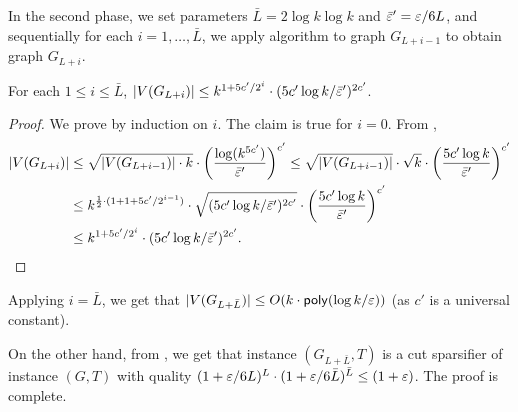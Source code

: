 In the second phase, we set parameters $\bar L=2\log k\log k$ and $\bar{{\varepsilon}}'={\varepsilon}/6L$, and sequentially for each $i=1,\ldots,\bar L$, we apply algorithm  to graph $G_{L+i-1}$ to obtain graph $G_{L+i}$.

\begin{claim}
	For each $1\le i\le \bar L$, $|V(G_{L+i})|\le k^{1+5c'/2^i}\cdot (5c'\log k/\bar{{\varepsilon}}')^{2c'}$.
\end{claim}
\begin{proof}
	We prove by induction on $i$. The claim is true for $i=0$.
	From ,
	\[
	\begin{split}
	|V(G_{L+i})| & \le \sqrt{|V(G_{L+i-1})|\cdot k}\cdot \bigg(\frac{\log (k^{5c'})}{\bar{{\varepsilon}}'}\bigg)^{c'}
	\le 
	\sqrt{|V(G_{L+i-1})|}\cdot \sqrt{k}\cdot\bigg(\frac{5c'\log k}{\bar{{\varepsilon}}'}\bigg)^{c'}\\
	& \le  k^{\frac{1}{2}\cdot (1+1+5c'/2^{i-1})}\cdot \sqrt{(5c'\log k/\bar{{\varepsilon}}')^{2c'}}\cdot\bigg(\frac{5c'\log k}{\bar{{\varepsilon}}'}\bigg)^{c'}\\
	& \le k^{1+5c'/2^i}\cdot (5c'\log k/\bar{{\varepsilon}}')^{2c'}.
	\end{split}
	\]
\end{proof}
Applying $i=\bar L$, we get that $|V(G_{L+\bar L})|\le O(k\cdot \mathsf{poly}(\log k/{\varepsilon}))$ (as $c'$ is a universal constant).

On the other hand, from , we get that instance $(G_{L+\bar L},T)$ is a cut sparsifier of  instance $(G,T)$ with quality
$(1+{\varepsilon}/6L)^L\cdot (1+{\varepsilon}/6\bar L)^{\bar L}\le (1+{\varepsilon})$. The proof is complete.









